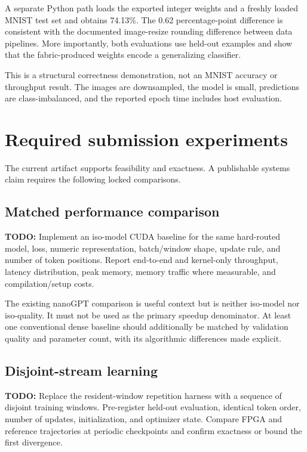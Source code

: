 \documentclass[10pt]{article}
\newcommand{\todo}[1]{\textcolor{red!70!black}{\textbf{TODO:} #1}}
\begin{document}
A separate Python path loads the exported integer weights and a freshly loaded
MNIST test set and obtains 74.13\%.  The 0.62 percentage-point difference is
consistent with the documented image-resize rounding difference between data
pipelines.  More importantly, both evaluations use held-out examples and show
that the fabric-produced weights encode a generalizing classifier.

This is a structural correctness demonstration, not an MNIST accuracy or
throughput result.  The images are downsampled, the model is small, predictions
are class-imbalanced, and the reported epoch time includes host evaluation.

\section{Required submission experiments}

The current artifact supports feasibility and exactness.  A publishable systems
claim requires the following locked comparisons.

\subsection{Matched performance comparison}

\todo{Implement an iso-model CUDA baseline for the same hard-routed model, loss,
numeric representation, batch/window shape, update rule, and number of token
positions.  Report end-to-end and kernel-only throughput, latency distribution,
peak memory, memory traffic where measurable, and compilation/setup costs.}

The existing nanoGPT comparison is useful context but is neither iso-model nor
iso-quality.  It must not be used as the primary speedup denominator.  At least
one conventional dense baseline should additionally be matched by validation
quality and parameter count, with its algorithmic differences made explicit.

\subsection{Disjoint-stream learning}

\todo{Replace the resident-window repetition harness with a sequence of disjoint
training windows.  Pre-register held-out evaluation, identical token order,
number of updates, initialization, and optimizer state.  Compare FPGA and
reference trajectories at periodic checkpoints and confirm exactness or bound
the first divergence.}
\end{document}
